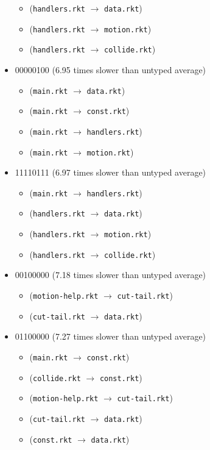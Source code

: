 \documentclass{article}
\newcommand{\mono}[1]{\texttt{#1}}
\begin{document}
\begin{itemize}
\begin{itemize}
  \item (\mono{handlers.rkt} $\rightarrow$ \mono{data.rkt})
  \item (\mono{handlers.rkt} $\rightarrow$ \mono{motion.rkt})
  \item (\mono{handlers.rkt} $\rightarrow$ \mono{collide.rkt})
  \end{itemize}
\item 00000100 (6.95 times slower than untyped average)
  \begin{itemize}
  \item (\mono{main.rkt} $\rightarrow$ \mono{data.rkt})
  \item (\mono{main.rkt} $\rightarrow$ \mono{const.rkt})
  \item (\mono{main.rkt} $\rightarrow$ \mono{handlers.rkt})
  \item (\mono{main.rkt} $\rightarrow$ \mono{motion.rkt})
  \end{itemize}
\item 11110111 (6.97 times slower than untyped average)
  \begin{itemize}
  \item (\mono{main.rkt} $\rightarrow$ \mono{handlers.rkt})
  \item (\mono{handlers.rkt} $\rightarrow$ \mono{data.rkt})
  \item (\mono{handlers.rkt} $\rightarrow$ \mono{motion.rkt})
  \item (\mono{handlers.rkt} $\rightarrow$ \mono{collide.rkt})
  \end{itemize}
\item 00100000 (7.18 times slower than untyped average)
  \begin{itemize}
  \item (\mono{motion-help.rkt} $\rightarrow$ \mono{cut-tail.rkt})
  \item (\mono{cut-tail.rkt} $\rightarrow$ \mono{data.rkt})
  \end{itemize}
\item 01100000 (7.27 times slower than untyped average)
  \begin{itemize}
  \item (\mono{main.rkt} $\rightarrow$ \mono{const.rkt})
  \item (\mono{collide.rkt} $\rightarrow$ \mono{const.rkt})
  \item (\mono{motion-help.rkt} $\rightarrow$ \mono{cut-tail.rkt})
  \item (\mono{cut-tail.rkt} $\rightarrow$ \mono{data.rkt})
  \item (\mono{const.rkt} $\rightarrow$ \mono{data.rkt})

\end{itemize}
\end{itemize}
\end{document}
